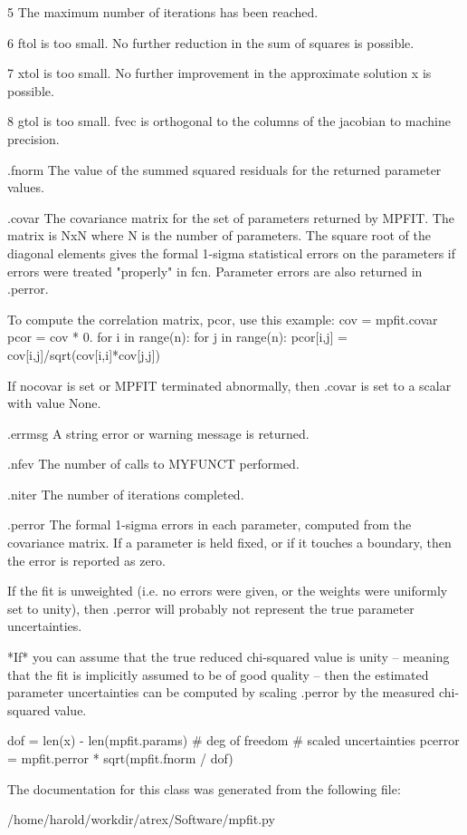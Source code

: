 \begin{DoxyVerb}
5  The maximum number of iterations has been reached.

6  ftol is too small. No further reduction in the sum of squares is
   possible.

7  xtol is too small. No further improvement in the approximate solution
   x is possible.

8  gtol is too small. fvec is orthogonal to the columns of the jacobian
   to machine precision.

     .fnorm
The value of the summed squared residuals for the returned parameter
values.

     .covar
The covariance matrix for the set of parameters returned by MPFIT.
The matrix is NxN where N is the number of  parameters.  The square root
of the diagonal elements gives the formal 1-sigma statistical errors on
the parameters if errors were treated "properly" in fcn.
Parameter errors are also returned in .perror.

To compute the correlation matrix, pcor, use this example:
   cov = mpfit.covar
   pcor = cov * 0.
   for i in range(n):
      for j in range(n):
 pcor[i,j] = cov[i,j]/sqrt(cov[i,i]*cov[j,j])

If nocovar is set or MPFIT terminated abnormally, then .covar is set to
a scalar with value None.

     .errmsg
A string error or warning message is returned.

     .nfev
The number of calls to MYFUNCT performed.

     .niter
The number of iterations completed.

     .perror
The formal 1-sigma errors in each parameter, computed from the
covariance matrix.  If a parameter is held fixed, or if it touches a
boundary, then the error is reported as zero.

If the fit is unweighted (i.e. no errors were given, or the weights
were uniformly set to unity), then .perror will probably not represent
the true parameter uncertainties.

*If* you can assume that the true reduced chi-squared value is unity --
meaning that the fit is implicitly assumed to be of good quality --
then the estimated parameter uncertainties can be computed by scaling
.perror by the measured chi-squared value.

   dof = len(x) - len(mpfit.params) # deg of freedom
   # scaled uncertainties
   pcerror = mpfit.perror * sqrt(mpfit.fnorm / dof)\end{DoxyVerb}
 

The documentation for this class was generated from the following file\-:\begin{DoxyCompactItemize}
\item 
/home/harold/workdir/atrex/\-Software/mpfit.\-py\end{DoxyCompactItemize}
